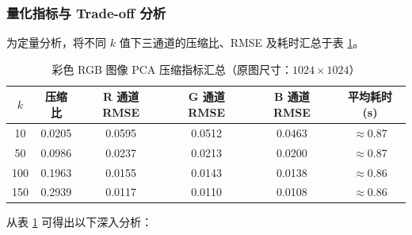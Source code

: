 \documentclass[a4paper]{article}
\begin{document}
\subsubsection{量化指标与 Trade-off 分析}

为定量分析，将不同 $k$ 值下三通道的压缩比、RMSE 及耗时汇总于表 \ref{tab:rgb_metrics}。

\begin{table}[H]
\centering
\caption{彩色 RGB 图像 PCA 压缩指标汇总（原图尺寸：$1024 \times 1024$）}
\label{tab:rgb_metrics}
\begin{tabular}{cccccc}
\toprule
$k$ & 压缩比 & R 通道 RMSE & G 通道 RMSE & B 通道 RMSE & 平均耗时 (s) \\
\midrule
10  & 0.0205 & 0.0595 & 0.0512 & 0.0463 & $\approx$0.87 \\
50  & 0.0986 & 0.0237 & 0.0213 & 0.0200 & $\approx$0.87 \\
100 & 0.1963 & 0.0155 & 0.0143 & 0.0138 & $\approx$0.86 \\
150 & 0.2939 & 0.0117 & 0.0110 & 0.0108 & $\approx$0.86 \\
\bottomrule
\end{tabular}
\end{table}

从表 \ref{tab:rgb_metrics} 可得出以下深入分析：
\end{document}
